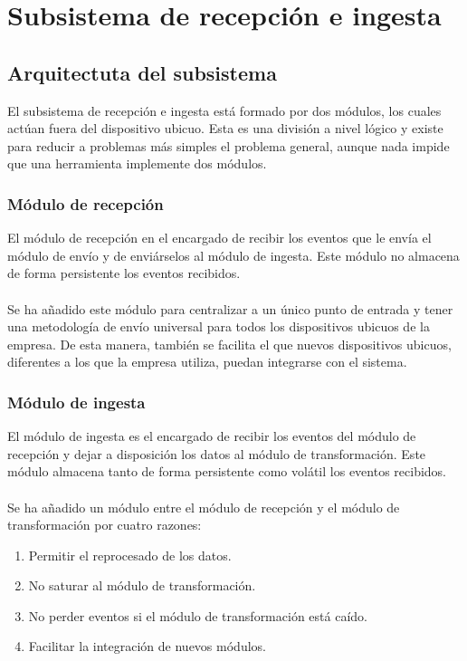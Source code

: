 \chapter{Subsistema de recepción e ingesta}

\section{Arquitectuta del subsistema}

El subsistema de recepción e ingesta está formado por dos módulos, los cuales actúan fuera del dispositivo ubicuo. Esta es una división a nivel lógico y existe para reducir a problemas más simples el problema general, aunque nada impide que una herramienta implemente dos módulos.

\subsection{Módulo de recepción}

El módulo de recepción en el encargado de recibir los eventos que le envía el módulo de envío y de enviárselos al módulo de ingesta. Este módulo no almacena de forma persistente los eventos recibidos.
\\\\
Se ha añadido este módulo para centralizar a un único punto de entrada y tener una metodología de envío universal para todos los dispositivos ubicuos de la empresa. De esta manera, también se facilita el que nuevos dispositivos ubicuos, diferentes a los que la empresa utiliza, puedan integrarse con el sistema.

\subsection{Módulo de ingesta} 

El módulo de ingesta es el encargado de recibir los eventos del módulo de recepción y dejar a disposición los datos al módulo de transformación. Este módulo almacena tanto de forma persistente como volátil los eventos recibidos.
\\\\
Se ha añadido un módulo entre el módulo de recepción y el módulo de transformación por cuatro razones:

\begin{enumerate}
	\item Permitir el reprocesado de los datos.
	\item No saturar al módulo de transformación.
	\item No perder eventos si el módulo de transformación está caído.
	\item Facilitar la integración de nuevos módulos.
\end{enumerate}

